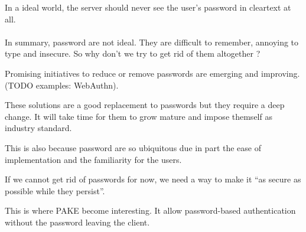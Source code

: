\documentclass[../report.tex]{subfiles}
\begin{document}
In a ideal world, the server should never see the user's password in cleartext at all.


\paragraph{}

In summary, password are not ideal. They are difficult to remember, annoying to type and insecure.
So why don't we try to get rid of them altogether ?

Promising initiatives to reduce or remove passwords are emerging and improving. (TODO examples: WebAuthn).

These solutions are a good replacement to passwords but they require a deep change. It will take time for them to grow mature and impose themself as industry standard.

This is also because password are so ubiquitous due in part the ease of implementation and the familiarity for the users.

If we cannot get rid of passwords for now, we need a way to make it ``as secure as possible while they persist''.



This is where PAKE become interesting. It allow password-based authentication without the password leaving the client.




\subsection{}
\paragraph{}

% 
\end{document}
